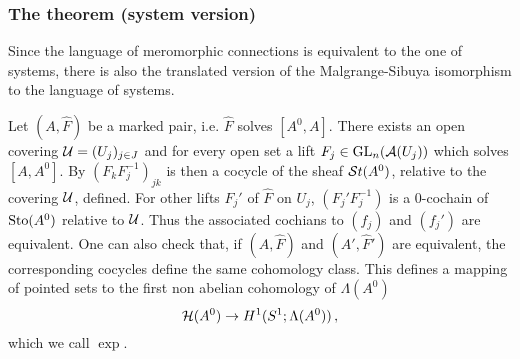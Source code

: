 \subsubsection{The theorem (system version)}
Since the language of meromorphic connections is equivalent to the one of
systems, there is also the translated version of the Malgrange-Sibuya
isomorphism to the language of systems.
\begin{comment}
  \begin{itemize}
    \item \TODO[See \cite{thboalch} for sheaf-less definition]
  \end{itemize}
\end{comment}
Let $(A,\hat F)$ be a marked pair, i.e. $\hat F$ solves $[A^0,A]$.
There exists an open covering $\mathcal{U}=(U_j)_{j\in J}$ and for every open set
a lift $F_j\in\operatorname{GL}_n(\mathcal{A}(U_j))$ which solves $[A,A^0]$.
By $(F_kF_j^{-1})_{jk}$ is then a cocycle of the sheaf $\mathcal{S}{}t(A^0)$, relative to
the covering $\mathcal{U}$, defined.
For other lifts $F_j'$ of $\hat F$ on $U_j$, $(F_j'F_j^{-1})$ is a $0$-cochain
of $\operatorname{Sto}(A^0)$ relative to $\mathcal{U}$.
Thus the associated cochians to $(f_j)$ and $(f_j')$ are equivalent.
One can also check that, if $(A,\hat F)$ and $(A',\hat F')$ are equivalent, the
corresponding cocycles define the same cohomology class.
This defines a mapping of pointed sets to the first non abelian cohomology of
$\Lambda(A^0)$
\[
  \mathcal{H}(A^0)\to H^1(S^1;\Lambda(A^0)) \,,
\]
which we call $\exp$.

